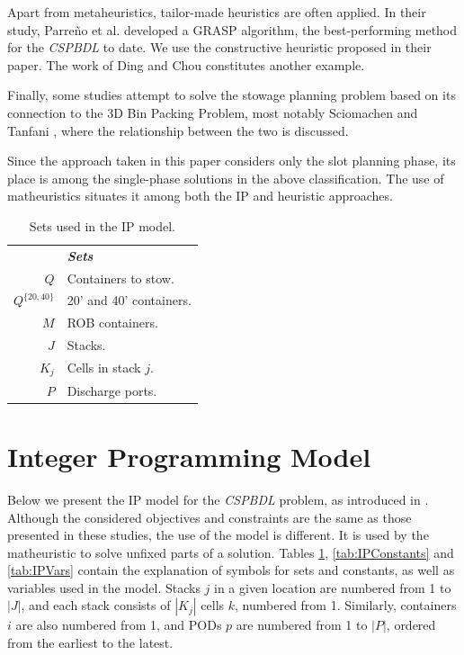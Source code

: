 \documentclass[preprint,12pt,3p]{elsarticle}
\begin{document}
Apart from metaheuristics, tailor-made heuristics are often applied. In their study, Parre\~{n}o et al. \cite{PPAV16} developed a GRASP algorithm, the best-performing method for the \textit{CSPBDL} to date. We use the constructive heuristic proposed in their paper. The work of Ding and Chou \cite{DC15} constitutes another example.

Finally, some studies attempt to solve the stowage planning problem based on its connection to the 3D Bin Packing Problem, most notably Sciomachen and Tanfani \cite{ST03}, where the relationship between the two is discussed.

Since the approach taken in this paper considers only the slot planning phase, its place is among the single-phase solutions in the above classification. The use of matheuristics situates it among both the IP and heuristic approaches.

\begin{table} [ht]
\begin{tabular}{rl}
    & \textbf{\textit{Sets}}\\
    $Q$& Containers to stow.\\
    $Q^{\{20, 40\}}$& 20' and 40' containers.\\
    $M$& ROB containers.\\
    $J$& Stacks.\\
    $K_j$& Cells in stack $j$.\\
    $P$& Discharge ports.
\end{tabular}
\caption{Sets used in the IP model.}
\label{tab:IPSets}
\end{table}

\section{Integer Programming Model}
\label{sec:Model}

Below we present the IP model for the \textit{CSPBDL} problem, as introduced in \cite{DJJRA12, DPhD}. Although the considered objectives and constraints are the same as those presented in these studies, the use of the model is different. It is used by the matheuristic to solve unfixed parts of a solution. Tables \ref{tab:IPSets}, \ref{tab:IPConstants} and \ref{tab:IPVars} contain the explanation of symbols for sets and constants, as well as variables used in the model. Stacks $j$ in a given location are numbered from 1 to $|J|$, and each stack consists of $|K_j|$ cells $k$, numbered from 1. Similarly, containers $i$ are also numbered from 1, and PODs $p$ are numbered from 1 to $|P|$, ordered from the earliest to the latest.
\end{document}
